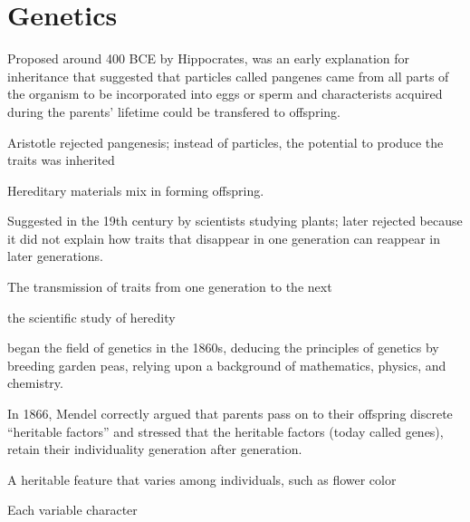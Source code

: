 \chapter{Genetics}
\newcommand{\pangenesisdef}{Proposed around 400 BCE by Hippocrates, was an early explanation for inheritance that suggested that particles called pangenes came from all parts of the organism to be incorporated into eggs or sperm and characterists acquired during the parents' lifetime could be transfered to offspring.}
\begin{definition}[Pangenesis] \label{definition:pangenesis}
    \pangenesisdef
\end{definition}
 Aristotle rejected pangenesis; instead of particles, the potential to produce the traits was inherited

 \newcommand{\blendinghdef}{Hereditary materials mix in forming offspring.}
 \begin{definition} \label{definition:blendingh}
    \blendinghdef

    Suggested in the 19th century by scientists studying plants; later rejected because it did not explain how traits that disappear in one generation can reappear in later generations.
 \end{definition}

\newcommand{\hereditydef}{The transmission of traits from one generation to the next}
\begin{definition}[Heredity] \label{definition:heredity}
    \hereditydef
\end{definition}
\newcommand{\geneticsdef}{the scientific study of heredity}
\begin{definition}[Genetics] \label{definition:genetics}
    \geneticsdef
\end{definition}
\newcommand{\mendeldef}{began the field of genetics in the 1860s, deducing the principles of genetics by breeding garden peas, relying upon a background of mathematics, physics, and chemistry.}
\begin{definition} \label{definition:mendel}
    \mendeldef

    In 1866, Mendel correctly argued that parents pass on to their offspring discrete ``heritable factors'' and stressed that the heritable factors (today called genes), retain their individuality generation after generation.
\end{definition}

\newcommand{\characterdef}{A heritable feature that varies among individuals, such as flower color}
\begin{definition}[Character] \label{definition:character}
    \characterdef
\end{definition}
\newcommand{\traitdef}{Each variable character}
\begin{definition}[Trait] \label{definition:trait}
    \traitdef
\end{definition}

